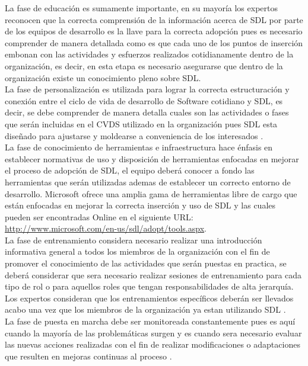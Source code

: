 \documentclass[runningheads,a4paper]{llncs}
\begin{document}
La fase de educación es sumamente importante, en su mayoría los expertos reconocen que la correcta comprensión de la información acerca de \gls{SDL} por parte de los equipos de desarrollo es la llave para la correcta adopción pues es necesario comprender de manera detallada como es que cada uno de los puntos de inserción embonan con las actividades y esfuerzos realizados cotidianamente dentro de la organización, es decir, en esta etapa es necesario asegurarse que dentro de la organización existe un conocimiento pleno sobre \gls{SDL}. \\

La fase de personalización es utilizada para lograr la correcta estructuración y conexión entre el ciclo de vida de desarrollo de Software cotidiano y \gls{SDL}, es decir, se debe comprender de manera detalla cuales son las actividades o fases que serán incluidas en el \gls{CVDS} utilizado en la organización pues \gls{SDL} esta diseñado para ajustarse y moldearse a conveniencia de los interesados \cite{SDLWhitePaper}. \\

La fase de conocimiento de herramientas e infraestructura hace énfasis en establecer normativas de uso y disposición de herramientas enfocadas en mejorar el proceso de adopción de \gls{SDL}, el equipo deberá conocer a fondo las herramientas que serán utilizadas ademas de establecer un correcto entorno de desarrollo. Microsoft ofrece una amplia gama de herramientas libre de cargo que están enfocadas en mejorar la correcta inserción y uso de \gls{SDL} y las cuales pueden ser encontradas \gls{Online} en el siguiente \gls{URL}: \url{http://www.microsoft.com/en-us/sdl/adopt/tools.aspx}. \\

La fase de entrenamiento considera necesario realizar una introducción informativa general a todos los miembros de la organización con el fin de promover el conocimiento de las actividades que serán puestas en practica, se deberá considerar que sera necesario realizar sesiones de entrenamiento para cada tipo de rol o para aquellos roles que tengan responsabilidades de alta jerarquía. Los expertos consideran que los entrenamientos específicos deberán ser llevados acabo una vez que los miembros de la organización ya estan utilizando \gls{SDL} \cite{SDLWhitePaper}. \\

La fase de puesta en marcha debe ser monitoreada constantemente pues es aquí cuando la mayoría de las problemáticas surgen y es cuando sera necesario evaluar las nuevas acciones realizadas con el fin de realizar modificaciones o adaptaciones que resulten en mejoras continuas al proceso \cite{SDLWhitePaper}. \\
\end{document}
